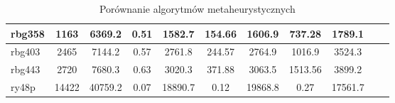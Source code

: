 \begin{center}
\begin{table}
\begin{tabular}{lcccccccccc}
\midrule
rbg358 & 1163 & 6369.2 & 0.51 & 1582.7 & 154.66 & 1606.9 & 737.28 & 1789.1 \\
\midrule
rbg403 & 2465 & 7144.2 & 0.57 & 2761.8 & 244.57 & 2764.9 & 1016.9 & 3524.3 \\
\midrule
rbg443 & 2720 & 7680.3 & 0.63 & 3020.3 & 371.88 & 3063.5 & 1513.56 & 3899.2 \\
\midrule
ry48p & 14422 & 40759.2 & 0.07 & 18890.7 & 0.12 & 19868.8 & 0.27 & 17561.7 \\
\bottomrule
\end{tabular}
\label{algotirhms_compare}
\caption{Porównanie algorytmów metaheurystycznych}
\end{table}
\end{center}


\begin{center}
\begin{table}
\begin{tabular}{lcccccccccc}


\end{tabular}
\end{table}
\end{center}
